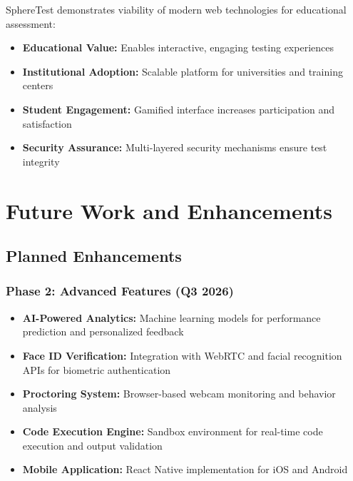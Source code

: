 \documentclass[12pt,a4paper]{report}
\begin{document}
SphereTest demonstrates viability of modern web technologies for educational assessment:

\begin{itemize}[left=0pt]
  \item \textbf{Educational Value:} Enables interactive, engaging testing experiences
  \item \textbf{Institutional Adoption:} Scalable platform for universities and training centers
  \item \textbf{Student Engagement:} Gamified interface increases participation and satisfaction
  \item \textbf{Security Assurance:} Multi-layered security mechanisms ensure test integrity
\end{itemize}

\cleardoublepage


\chapter{Future Work and Enhancements}

\section{Planned Enhancements}

\subsection{Phase 2: Advanced Features (Q3 2026)}

\begin{itemize}[left=0pt]
  \item \textbf{AI-Powered Analytics:} Machine learning models for performance prediction and personalized feedback
  
  \item \textbf{Face ID Verification:} Integration with WebRTC and facial recognition APIs for biometric authentication
  
  \item \textbf{Proctoring System:} Browser-based webcam monitoring and behavior analysis
  
  \item \textbf{Code Execution Engine:} Sandbox environment for real-time code execution and output validation
  
  \item \textbf{Mobile Application:} React Native implementation for iOS and Android
\end{itemize}
\end{document}
